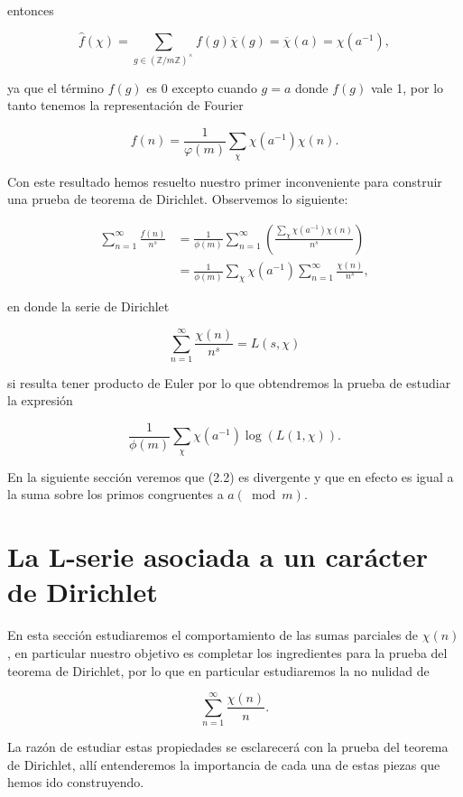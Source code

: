 entonces

$$
\hat{f}(\chi)=\sum_{g \in(\mathbb{Z} / m \mathbb{Z})^{\times}} f(g) \overline{\chi}(g)=\overline{\chi}(a)=\chi\left(a^{-1}\right),
$$

 ya que el término $f(g)$ es $0$ excepto cuando $g=a$ donde $f(g)$ vale 1, por lo tanto tenemos la representación de Fourier

$$
\boxed{f(n)=\frac{1}{\varphi(m)} \sum_\chi \chi\left(a^{-1}\right) \chi(n).
}
$$

Con este resultado hemos resuelto nuestro primer inconveniente para construir una prueba de teorema de Dirichlet. Observemos lo siguiente:

\begin{align*}
    \sum_{n=1}^{\infty}\frac{f(n)}{n^s}&=\frac{1}{\phi(m)}\sum_{n=1}^{\infty} \left(\frac{\displaystyle\sum_{\chi}\chi(a^{-1})\chi(n)}{n^s}\right)\\
    &=\frac{1}{\phi(m)}\sum_{\chi}\chi(a^{-1})\sum_{n=1}^{\infty}\frac{\chi(n)}{n^s}
,\end{align*}

en donde la serie de Dirichlet

$$\sum_{n=1}^{\infty} \frac{\chi(n)}{n^s}=L(s,\chi)$$

si resulta tener producto de Euler por lo que obtendremos la prueba de estudiar la expresión

\begin{equation}
\frac{1}{\phi(m)}\sum_{\chi}\chi(a^{-1})\log(L(1,\chi)).
\end{equation}

En la siguiente sección veremos que (2.2) es divergente y que en efecto es igual a la suma sobre los primos congruentes a $a (\bmod{m})$.

\section{La L-serie asociada a un carácter de Dirichlet}

En esta sección estudiaremos el comportamiento de las sumas parciales de $\chi(n)$, en particular nuestro objetivo es completar los ingredientes para la prueba del teorema de Dirichlet, por lo que en particular estudiaremos la no nulidad de 

$$\sum_{n=1}^{\infty} \frac{\chi(n)}{n}.$$

La razón de estudiar estas propiedades se esclarecerá con la prueba del teorema de Dirichlet, allí entenderemos la importancia de cada una de estas piezas que hemos ido construyendo.

